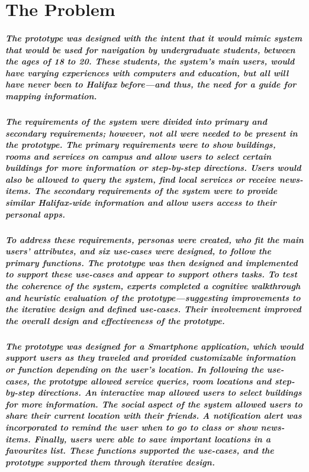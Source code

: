 \documentclass{report}
\begin{document}
\chapter{The Problem}
    \paragraph{The prototype was designed with the intent that it would mimic
    system that would be used for navigation by undergraduate students, between the
    ages of 18 to 20. These students, the system’s main users, would have varying
    experiences with computers and education, but all will have never been to
    Halifax before—and thus, the need for a guide for mapping information.}
    \paragraph{The requirements of the system were divided into primary and
    secondary requirements; however, not all were needed to be present in the
    prototype. The primary requirements were to show buildings, rooms and services
    on campus and allow users to select certain buildings for more information or
    step-by-step directions. Users would also be allowed to query the system, find
    local services or receive news-items. The secondary requirements of the system
    were to provide similar Halifax-wide information and allow users access to their
    personal apps.}
    \paragraph{To address these requirements, personas were created, who fit the
    main users’ attributes, and six use-cases were designed, to follow the primary
    functions. The prototype was then designed and implemented to support these
    use-cases and appear to support others tasks. To test the coherence of the
    system, experts completed a cognitive walkthrough and heuristic evaluation of
    the prototype—suggesting improvements to the iterative design and defined
    use-cases. Their involvement improved the overall design and effectiveness of
    the prototype.}
    \paragraph{The prototype was designed for a Smartphone application, which
    would support users as they traveled and provided customizable information or
    function depending on the user’s location. In following the use-cases, the
    prototype allowed service queries, room locations and step-by-step directions.
    An interactive map allowed users to select buildings for more information. The
    social aspect of the system allowed users to share their current location with
    their friends. A notification alert was incorporated to remind the user when to
    go to class or show news-items. Finally, users were able to save important
    locations in a favourites list. These functions supported the use-cases, and the
    prototype supported them through iterative design.}
\end{document}

